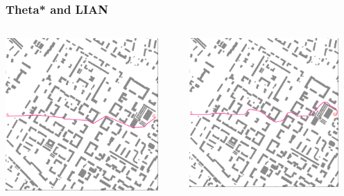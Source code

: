 \documentclass[default]{beamer}
\begin{document}
	\begin{frame}
		\frametitle{Theta* and LIAN}
		
		\begin{columns}
			\begin{column}{0.5\textwidth}
				\centering
				\includegraphics[width=0.9\textwidth]{misc/plan_theta.png}
			\end{column}
			\begin{column}{0.5\textwidth}
				\centering
				\includegraphics[width=0.9\textwidth]{misc/plan_lian.png}
			\end{column}
		\end{columns}
	\end{frame}
\end{document}
